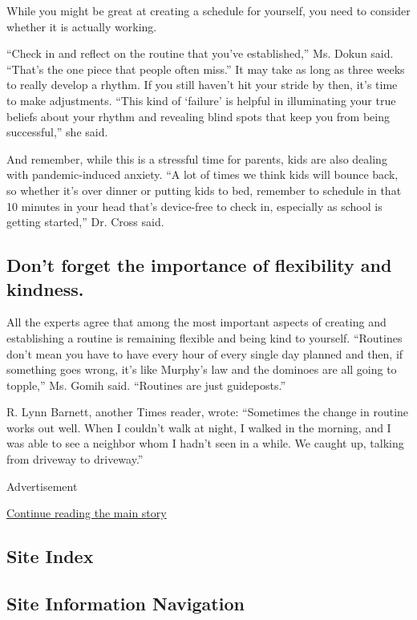 While you might be great at creating a schedule for yourself, you need
to consider whether it is actually working.

``Check in and reflect on the routine that you've established,'' Ms.
Dokun said. ``That's the one piece that people often miss.'' It may take
as long as three weeks to really develop a rhythm. If you still haven't
hit your stride by then, it's time to make adjustments. ``This kind of
`failure' is helpful in illuminating your true beliefs about your rhythm
and revealing blind spots that keep you from being successful,'' she
said.

And remember, while this is a stressful time for parents, kids are also
dealing with pandemic-induced anxiety. ``A lot of times we think kids
will bounce back, so whether it's over dinner or putting kids to bed,
remember to schedule in that 10 minutes in your head that's device-free
to check in, especially as school is getting started,'' Dr. Cross said.

\hypertarget{dont-forget-the-importance-of-flexibility-and-kindness}{%
\subsection{Don't forget the importance of flexibility and
kindness.}\label{dont-forget-the-importance-of-flexibility-and-kindness}}

All the experts agree that among the most important aspects of creating
and establishing a routine is remaining flexible and being kind to
yourself. ``Routines don't mean you have to have every hour of every
single day planned and then, if something goes wrong, it's like Murphy's
law and the dominoes are all going to topple,'' Ms. Gomih said.
``Routines are just guideposts.''

R. Lynn Barnett, another Times reader, wrote: ``Sometimes the change in
routine works out well. When I couldn't walk at night, I walked in the
morning, and I was able to see a neighbor whom I hadn't seen in a while.
We caught up, talking from driveway to driveway.''

Advertisement

\protect\hyperlink{after-bottom}{Continue reading the main story}

\hypertarget{site-index}{%
\subsection{Site Index}\label{site-index}}

\hypertarget{site-information-navigation}{%
\subsection{Site Information
Navigation}\label{site-information-navigation}}

